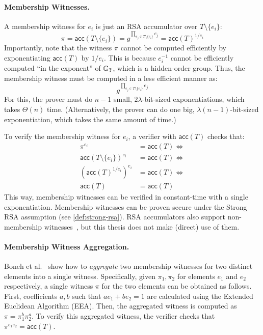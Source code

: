 \paragraph{Membership Witnesses.}
A membership witness for $e_i$ is just an RSA accumulator over $T\setminus\{e_i\}$:
$$\pi=\mathsf{acc}(T\setminus\{e_i\}) = g^{\prod_{e_j\in T\setminus\{e_i\}} e_j} = \mathsf{acc}(T)^{1/e_i}$$
Importantly, note that the witness $\pi$ cannot be computed efficiently by exponentiating $\mathsf{acc}(T)$ by $1/e_i$.
This is because $e_i^{-1}$ cannot be efficiently computed ``in the exponent'' of $\mathbb{G}_{\textbf{?}}$, which is a hidden-order group.
Thus, the membership witness must be computed in a less efficient manner as:
$$g^{\prod_{e_j\in T\setminus\{e_i\}} e_j}$$
For this, the prover must do $n-1$ small, $2\lambda$-bit-sized exponentiations, which takes $\Theta(n)$ time.
(Alternatively, the prover can do one big, $\lambda (n-1)$-bit-sized exponentiation, which takes the same amount of time.)

To verify the membership witness for $e_i$, a verifier with $\mathsf{acc}(T)$ checks that:
\begin{align}
    \pi^{e_i} &= \mathsf{acc}(T) \Leftrightarrow\\
    \mathsf{acc}(T\setminus\{e_i\})^{e_i} &= \mathsf{acc}(T) \Leftrightarrow\\
    \left(\mathsf{acc}(T)^{1/e_i}\right)^{e_i} &= \mathsf{acc}(T) \Leftrightarrow\\
    \mathsf{acc}(T) &= \mathsf{acc}(T)
\end{align}
This way, membership witnesses can be verified in constant-time with a single exponentiation.
Membership witnesses can be proven secure under the Strong RSA assumption (see \cref{def:strong-rsa}).
RSA accumulators also support non-membership witnesses~\cite{LLX07}, but this thesis does not make (direct) use of them.

\paragraph{Membership Witness Aggregation.}
Boneh et al.~\cite{BBF19} show how to \textit{aggregate} two membership witnesses for two distinct elements into a single witness.
Specifically, given $\pi_1, \pi_2$ for elements $e_1$ and $e_2$ respectively, a single witness $\pi$ for the two elements can be obtained as follows.
First, \bezout coefficients $a,b$ such that $a e_1 + b e_2 = 1$ are calculated using the Extended Euclidean Algorithm (EEA).
Then, the aggregated witness is computed as $\pi=\pi_1^b \pi_2^a$.
To verify this aggregated witness, the verifier checks that $\pi^{e_1 e_2} = \mathsf{acc}(T)$.

